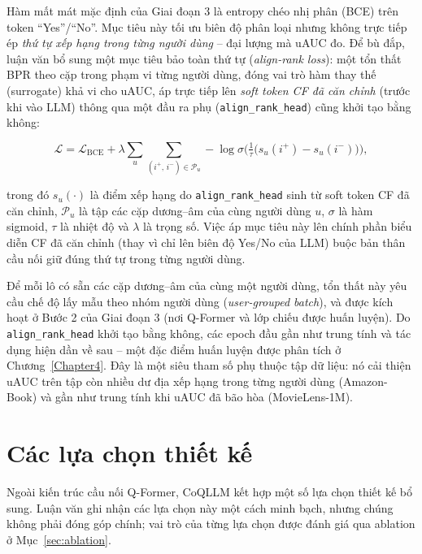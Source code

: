 Hàm mất mát mặc định của Giai đoạn 3 là entropy chéo nhị phân (BCE) trên token
``Yes''/``No''. Mục tiêu này tối ưu biên độ phân loại nhưng không trực tiếp ép \textit{thứ
tự xếp hạng trong từng người dùng} -- đại lượng mà uAUC đo. Để bù đắp, luận văn bổ sung một
mục tiêu bảo toàn thứ tự (\textit{align-rank loss}): một tổn thất BPR theo cặp trong phạm
vi từng người dùng, đóng vai trò hàm thay thế (surrogate) khả vi cho uAUC, áp trực tiếp lên
\textit{soft token CF đã căn chỉnh} (trước khi vào LLM) thông qua một đầu ra phụ
(\texttt{align\_rank\_head}) cũng khởi tạo bằng không:

\begin{equation} \label{eq:align-rank}
\mathcal{L} = \mathcal{L}_{\text{BCE}}
  + \lambda \sum_{u} \sum_{(i^{+},\, i^{-}) \in \mathcal{P}_u}
    -\log \sigma\!\Big( \tfrac{1}{\tau}\big( s_u(i^{+}) - s_u(i^{-}) \big) \Big),
\end{equation}

trong đó $s_u(\cdot)$ là điểm xếp hạng do \texttt{align\_rank\_head} sinh từ soft token CF
đã căn chỉnh, $\mathcal{P}_u$ là tập các cặp dương--âm của cùng người dùng $u$, $\sigma$ là
hàm sigmoid, $\tau$ là nhiệt độ và $\lambda$ là trọng số. Việc áp mục tiêu này lên chính
phần biểu diễn CF đã căn chỉnh (thay vì chỉ lên biên độ Yes/No của LLM) buộc bản thân cầu
nối giữ đúng thứ tự trong từng người dùng.

Để mỗi lô có sẵn các cặp dương--âm của cùng một người dùng, tổn thất này yêu cầu chế độ lấy
mẫu theo nhóm người dùng (\textit{user-grouped batch}), và được kích hoạt ở Bước 2 của Giai
đoạn 3 (nơi Q-Former và lớp chiếu được huấn luyện). Do \texttt{align\_rank\_head} khởi tạo
bằng không, các epoch đầu gần như trung tính và tác dụng hiện dần về sau -- một đặc điểm
huấn luyện được phân tích ở Chương~\ref{Chapter4}. Đây là một siêu tham số phụ thuộc tập dữ
liệu: nó cải thiện uAUC trên tập còn nhiều dư địa xếp hạng trong từng người dùng (Amazon-Book) và
gần như trung tính khi uAUC đã bão hòa (MovieLens-1M).

\section{Các lựa chọn thiết kế}
\label{sec:lua-chon-thiet-ke}

Ngoài kiến trúc cầu nối Q-Former, CoQLLM kết hợp một số lựa chọn thiết kế bổ sung. Luận
văn ghi nhận các lựa chọn này một cách minh bạch, nhưng chúng không phải đóng góp chính;
vai trò của từng lựa chọn được đánh giá qua ablation ở Mục~\ref{sec:ablation}.


